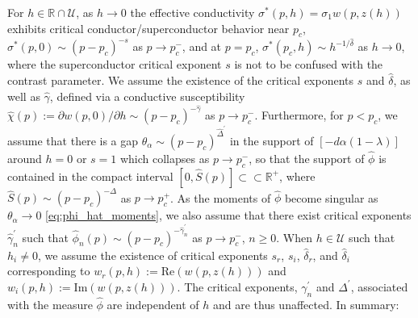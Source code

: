 \documentclass[english,12pt,jmp,graphicx]{revtex4-1}
\newcommand{\ph}{\hat{\phi}}
\newcommand{\gh}{\hat{\gamma}}
\newcommand{\Dh}{\hat{\Delta}}
\newcommand{\dha}{\hat{\delta}}
\begin{document}
For $h\in\mathbb{R}\cap\mathcal{U}$, as $h\to0$ the effective conductivity
$\sigma^*(p,h)=\sigma_1w(p,z(h))$ exhibits critical conductor/superconductor
behavior near $p_c$, $\sigma^*(p,0)\sim(p-p_c)^{-s}$ as $p\to p_c^-$, and at
$p=p_c$, $\sigma^*(p_c,h)\sim h^{-1/\dha}$ as $h\to0$, where the superconductor
critical exponent $s$ is not to be confused with the contrast
parameter. We assume the existence of the critical exponents $s$ and
$\dha$, as well as $\gh$, defined via a conductive susceptibility
$\hat{\chi}(p):=\partial w(p,0)/\partial h\sim(p-p_c)^{-\gh}$ as $p\to p_c^-$. Furthermore,
for $p<p_c$, we assume that there is a gap $\theta_\alpha\sim(p-p_c)^{\Dh^\prime}$ in the
support of $[-d\alpha(1-\lambda)]$ around $h=0$ or $s=1$ which collapses as
$p\to p_c^-$, so that the support of $\ph$ is contained in the compact
interval $[0,\hat{S}(p)]\subset\subset\mathbb{R}^+$, where
$\hat{S}(p)\sim(p-p_c)^{-\Delta}$ as $p\to p_c^+$. As the moments of $\ph$ become
singular as $\theta_\alpha\to0$ \eqref{eq:phi_hat_moments}, we also assume that
there exist critical exponents $\gh_n^\prime$ such that
$\ph_n(p)\sim(p-p_c)^{-\gh_n^\prime}$ as $p\to p_c^-$, $n\geq0$. When
$h\in\mathcal{U}$ such that $h_i\neq0$, we assume the existence of critical
exponents $s_r$, $s_i$, $\dha_r$, and $\dha_i$ corresponding to
$w_r(p,h):=\text{Re}(w(p,z(h)))$ and $w_i(p,h):=\text{Im}(w(p,z(h)))$. The
critical exponents, $\gamma_n^\prime$ and $\Delta^\prime$, associated with the measure
$\ph$ are independent of $h$ and are thus unaffected. In summary:
\end{document}
